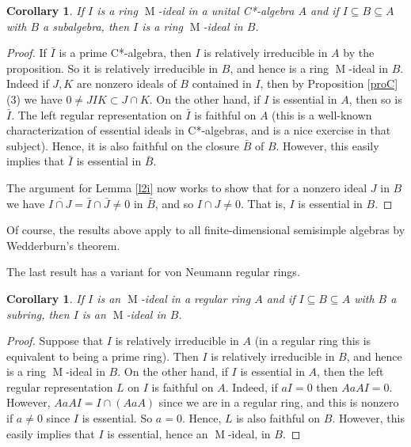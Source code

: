 \documentclass[11pt,leqno]{amsart}
\DeclareMathOperator{\m}{M}
\newtheorem{corollary}[theorem]{Corollary}
\theoremstyle{definition}
\theoremstyle{remark}
\numberwithin{equation}{section}
\numberwithin{equation}{section}
\begin{document}
\begin{corollary} \label{ncs} If $I$ is a ring $\m$-ideal in a unital C*-algebra $A$ and if $I \subseteq B \subseteq A$ with $B$ a
subalgebra, then $I$ is a ring $\m$-ideal in $B$.
\end{corollary}

\begin{proof}  If $\bar{I}$ is a prime C*-algebra, then $I$ is 
relatively irreducible  in $A$ by the proposition.
 So it is relatively irreducible  in $B$, and hence is a ring $\m$-ideal in $B$.    Indeed if $J,K$ are
nonzero ideals of  $B$ contained in $I$, then by Proposition \ref{proC}(3) we have $0 \neq JIK \subset  J\cap K$.
On the other hand, if $I$ is essential in $A$, then so is $\bar{I}$.
The left regular representation on $\bar{I}$ is faithful on $A$
(this is a well-known characterization of essential ideals in C*-algebras, and is a nice exercise in that subject). Hence, it is also faithful on the closure $\bar{B}$ of $B$.  However, this easily implies that  $\bar{I}$ is essential in $\bar{B}$. 

The argument for Lemma  \ref{l2i} now works to show that for a nonzero ideal $J$ in $B$ we have 
$\overline{I \cap J} = \bar{I} \cap \bar{J} \neq 0$ in $\bar{B}$, and so $I \cap J  \neq 0$.  That is, $I$ is essential in $B$. 
\end{proof}

Of course, the results above apply to all finite-dimensional semisimple algebras by Wedderburn's theorem.

The last result has a variant for von Neumann regular rings.

 \begin{corollary} \label{ncs2} If $I$ is an $\m$-ideal in a 
 regular  ring $A$ and if $I \subseteq B \subseteq A$ with $B$ a subring, then $I$ is an $\m$-ideal in $B$.
\end{corollary}

\begin{proof}   Suppose that  $I$ is 
relatively irreducible  in $A$ (in a regular ring this is equivalent     to being a prime ring).  Then  $I$ is 
relatively irreducible  in $B$, and hence is a ring $\m$-ideal in $B$.
On the other hand, if $I$ is essential in $A$, then the left regular representation $L$ on $I$ is faithful on $A$. Indeed, if $a I = 0$ then $AaAI = 0$.  However, $AaAI = I \cap (AaA)$ since we are in a regular  ring, and this is nonzero if $a \neq 0$
since $I$ is essential. So $a = 0$. 
Hence, $L$ is also faithful on $B$.  However, this easily implies that  $I$ is essential, hence an $\m$-ideal, in $B$. 
\end{proof} 
\end{document}
